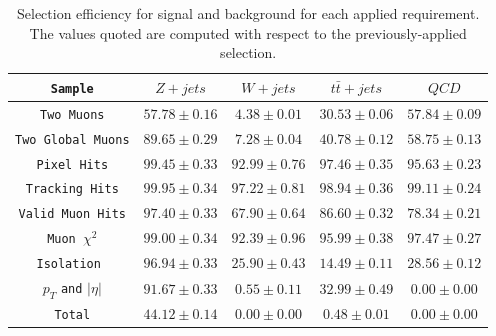 \documentclass{cmspaper}
\begin{document}
\begin{table}[htdp]
 \caption{Selection efficiency for signal and background for each
    applied requirement. The values quoted are computed with respect
    to the previously-applied selection.}
 \centering
 \begin{tabular}{|c|c|c|c|c|}
   \hline
   \verb|Sample| & $Z+jets$ & $W+jets$ & $t \bar t+jets$ & $QCD$ \\
   \hline
   \verb|Two Muons|          & $ 57.78 \pm 0.16 $ & $ 4.38 \pm 0.01 $ & $ 30.53 \pm 0.06 $ & $ 57.84 \pm 0.09 $ \\
   \verb|Two Global Muons|   & $ 89.65 \pm 0.29 $ & $ 7.28 \pm 0.04 $ & $ 40.78 \pm 0.12 $ & $ 58.75 \pm 0.13 $ \\
   \verb|Pixel Hits|         & $ 99.45 \pm 0.33 $ & $ 92.99 \pm 0.76 $ & $ 97.46 \pm 0.35 $ & $ 95.63 \pm 0.23 $ \\
   \verb|Tracking Hits|      & $ 99.95 \pm 0.34 $ & $ 97.22 \pm 0.81$ & $ 98.94 \pm 0.36 $ & $ 99.11 \pm 0.24 $ \\
   \verb|Valid Muon Hits|    & $ 97.40 \pm 0.33 $ & $ 67.90 \pm 0.64 $ & $ 86.60 \pm 0.32 $ & $ 78.34 \pm 0.21 $ \\
   \verb|Muon |$\chi^2$      & $ 99.00 \pm 0.34 $ & $ 92.39 \pm 0.96 $ & $ 95.99 \pm 0.38 $ & $ 97.47 \pm 0.27 $ \\
   \verb|Isolation |         & $ 96.94 \pm 0.33 $ & $ 25.90 \pm 0.43$ & $ 14.49 \pm 0.11 $ & $ 28.56 \pm 0.12 $ \\
   $p_T$ \verb|and| $|\eta|$ & $ 91.67 \pm 0.33 $ & $ 0.55 \pm 0.11 $ & $ 32.99 \pm 0.49 $ & $ 0.00 \pm 0.00 $ \\
   \hline
   \verb|Total|              & $ 44.12 \pm 0.14 $ & $ 0.00 \pm 0.00 $ & $ 0.48 \pm 0.01 $ & $ 0.00 \pm 0.00 $ \\
   \hline
   \end{tabular}
\label{Table_MCSelectionEfficiencies}
\end{table}
\end{document}
